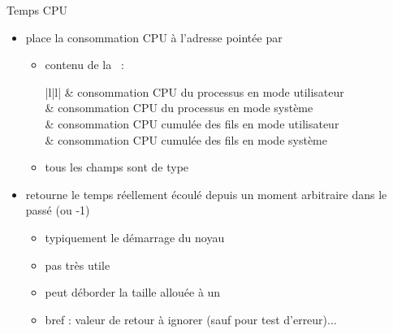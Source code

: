 \begin {frame} {Temps CPU}

    \begin {itemize}
	\item place la consommation CPU à l'adresse pointée par 
	    \begin {itemize}
		\item contenu de la ~:

		    \vspace* {-3mm}

		    \ctableau {\fD} {|l|l|} {
			    & consommation CPU du processus
				en mode utilisateur \\
			    & consommation CPU du processus
				en mode système \\
			    & consommation CPU cumulée des fils
				en mode utilisateur \\
			    & consommation CPU cumulée des fils
				en mode système \\
		    }

		    \vspace* {1mm}

		\item tous les champs sont de type 
	    \end {itemize}

	\item retourne le temps réellement écoulé depuis un moment
	    arbitraire dans le passé (ou -1)

	    \begin {itemize}
		\item typiquement le démarrage du noyau
		\item pas très utile
		\item peut déborder la taille allouée à un 
		\item bref : valeur de retour à ignorer (sauf pour test
		    d'erreur)...
	    \end {itemize}

    \end {itemize}
\end {frame}

